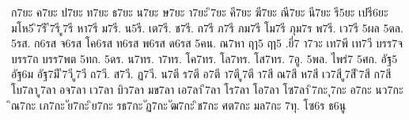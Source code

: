 {%
ก7ยะ
ค7ยะ
ป7ยะ
ท7ยะ
ธ7ยะ
น7ยะ
ษ7ยะ
า7ยะ
ิ7ยะ
คี7ยะ
ฆี7ยะ
ณี7ยะ
นี7ยะ
รี5ยะ
เปรี6ยะ
มโห5
ิ7รี
ี7รี
ู7รี
หา7รี
ม7รี.
น5รี.
เต7รี.
ช7รี.
ถ7รี
ภ7รี
ภม7รี
โม7รี
ภุม7ร
พ7รี.
เว7รี
5ผล
5ดล.
5รส.
ก6รส
จ6รส
โค6รส
ท6รส
พ6รส
ด6รส
5คน.
ณ7หา
ฤๅ5
ฤา5
.ยี่7
า7วะ
เท7พี
เท7วี
บรร7จ
บรร7ถ
บรร7พต
5ทก.
5ดร.
น7ทร.
า7ทร.
โค7ทร.
โล7ทร.
โส7ทร.
7อู.
5พล.
ไพร่7
5ศก.
อัฐ5
อัฐ6ม
อัฐ7มี
ี7วี
ู7วี
ถ7วี.
ส7วี.
ฏ7วี.
น7ตี
ร7ตี
อ7ตี
า7ตี
ู7ตี
า7สี
ณ7สี
ห7สี
เว7สี
ู7สี
ิ7สี
ก7สี
โบ7ลา
ู7ลา
อจ7ลา
เว7ลา
บิว7ลา
มข7ลา
เอ7ลา
ี7ลา
โร7ลา
โอ7ลา
โซ7ลา
ิ7กะ
ุ7กะ
อ7กะ
นว7กะ
ิณ7กะ
เภ7กะ
ัย7กะ
ิย7กะ
รธ7กะ
ัฏ7กะ
ัฒ7กะ
ิช7กะ
ศต7กะ
มล7กะ
7ทุ.
โซ6ร
ธ6นู
}
